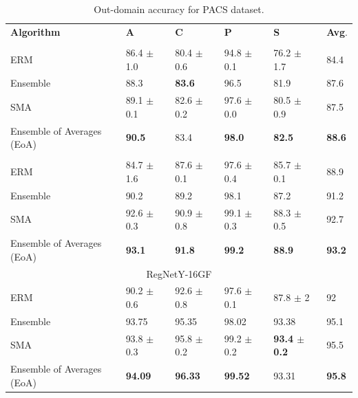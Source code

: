 \begin{table}[]
\centering
\caption{Out-domain accuracy for PACS dataset.}
\begin{tabular}{lllll|l}
\hline
\textbf{Algorithm}          & \textbf{A}           & \textbf{C}           & \textbf{P}     & \textbf{S}    & \textbf{Avg}. \\ \hhline{=====|=}
\multicolumn{6}{c}{{ResNet-50}}\\
\hline
ERM & 86.4 $\pm$ 1.0           & 80.4 $\pm$ 0.6           & 94.8 $\pm$ 0.1          & 76.2 $\pm$ 1.7         & 84.4\\
Ensemble & 88.3             & \textbf{83.6}           &       96.5         & 81.9 &   87.6  \\
\hline
\rowcolor{Gray}
SMA & 89.1 $\pm$ 0.1           & 82.6 $\pm$ 0.2           & 97.6 $\pm$ 0.0          & 80.5 $\pm$ 0.9         & 87.5\\
 \rowcolor{Gray}
Ensemble of Averages (EoA) & \textbf{90.5}           & 83.4           & \textbf{98.0}           &        \textbf{82.5}        & \textbf{88.6}\\ 
\hhline{=====|=}
\multicolumn{6}{c}{{ResNeXt-50 32x4d  \cite{yalniz2019billion}}}\\
\hline
ERM & 84.7 $\pm$ 1.6 & 87.6 $\pm$ 0.1 & 97.6 $\pm$ 0.4 & 85.7 $\pm$ 0.1 & 88.9 \\ %
Ensemble & 90.2             & 89.2                 & 98.1           &          87.2      &   91.2   \\
\hline
\rowcolor{Gray}
SMA    & 92.6 $\pm$ 0.3 & 90.9 $\pm$ 0.8   & 99.1 $\pm$ 0.3  & 88.3 $\pm$ 0.5 & 92.7 \\ 
 \rowcolor{Gray}
Ensemble of Averages (EoA) & \textbf{93.1}           & \textbf{91.8 }     & \textbf{99.2}   &  \textbf{88.9}   & \textbf{93.2} \\
\hline
\multicolumn{6}{c}{{RegNetY-16GF \cite{singh2022revisiting}}}\\
\hline
ERM & 90.2 $\pm$ 0.6 & 92.6 $\pm$ 0.8 & 97.6 $\pm$ 0.1 & 87.8 $\pm$ 2 & 92 \\ %
Ensemble &      93.75        &        95.35          &       98.02     &       93.38      &   95.1  \\
\hline
\rowcolor{Gray}
SMA    & 93.8 $\pm$ 0.3 & 95.8 $\pm$ 0.2   & 99.2 $\pm$ 0.2  & \textbf{93.4 $\pm$ 0.2} &  95.5\\ 
 \rowcolor{Gray}
Ensemble of Averages (EoA) & \textbf{94.09}           & \textbf{96.33}     & \textbf{99.52}   &  {93.31}   & \textbf{95.8} \\
\hline
\end{tabular}
\label{tab:pacs_perf}
\end{table}


